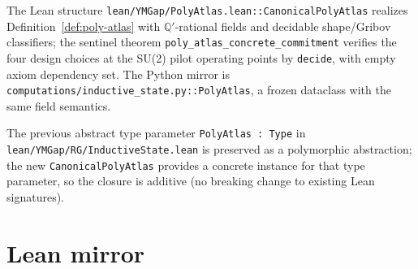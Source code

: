 \begin{remark}
\label{rem:poly-atlas-lean}
The Lean structure \texttt{lean/YMGap/PolyAtlas.lean::CanonicalPolyAtlas}
realizes Definition~\ref{def:poly-atlas} with $\mathbb{Q}'$-rational
fields and decidable shape/Gribov classifiers; the sentinel theorem
\texttt{poly\_atlas\_concrete\_commitment} verifies the four design
choices at the SU(2) pilot operating points by \texttt{decide}, with
empty axiom dependency set.  The Python mirror is
\texttt{computations/inductive\_state.py::PolyAtlas}, a frozen
dataclass with the same field semantics.

The previous abstract type parameter \texttt{PolyAtlas : Type} in
\texttt{lean/YMGap/RG/InductiveState.lean} is preserved as a
polymorphic abstraction; the new
\texttt{Canonical\-Poly\-Atlas} provides a concrete instance for that
type parameter, so the closure is additive (no breaking change to
existing Lean signatures).
\end{remark}

\section{Lean mirror}
\label{sec:lean}

